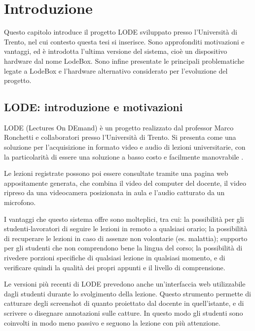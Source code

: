\chapter{Introduzione}
\label{cha:intro}

Questo capitolo introduce il progetto LODE sviluppato presso l'Università di Trento, nel cui contesto questa tesi si inserisce. Sono approfonditi motivazioni e vantaggi, ed è introdotta l'ultima versione del sistema, cioè un dispositivo hardware dal nome LodeBox. Sono infine presentate le principali problematiche legate a LodeBox e l'hardware alternativo considerato per l'evoluzione del progetto.

\section{LODE: introduzione e motivazioni}
\label{sec:intro_lode}

LODE (Lectures On DEmand) è un progetto realizzato dal professor Marco Ronchetti e collaboratori presso l'Università di Trento. Si presenta come una soluzione per l'acquisizione in formato video e audio di lezioni universitarie, con la particolarità di essere una soluzione a basso costo e facilmente manovrabile \cite{ronchetti}.

Le lezioni registrate possono poi essere consultate tramite una pagina web appositamente generata, che combina il video del computer del docente, il video ripreso da una videocamera posizionata in aula e l'audio catturato da un microfono.

I vantaggi che questo sistema offre sono molteplici, tra cui: la possibilità per gli studenti-lavoratori di seguire le lezioni in remoto a qualsiasi orario; la possibilità di recuperare le lezioni in caso di assenze non volontarie (es. malattia); supporto per gli studenti che non comprendono bene la lingua del corso; la possibilità di rivedere porzioni specifiche di qualsiasi lezione in qualsiasi momento, e di verificare quindi la qualità dei propri appunti e il livello di comprensione.

Le versioni più recenti di LODE prevedono anche un'interfaccia web utilizzabile dagli studenti durante lo svolgimento della lezione. Questo strumento permette di catturare degli screenshot di quanto proiettato dal docente in quell'istante, e di scrivere o disegnare annotazioni sulle catture. In questo modo gli studenti sono coinvolti in modo meno passivo e seguono la lezione con più attenzione.

